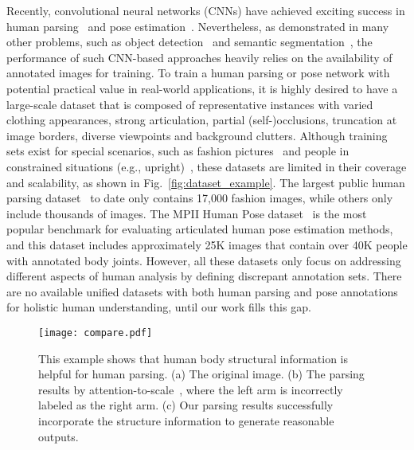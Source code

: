 \documentclass[10pt,journal,compsoc]{IEEEtran}
\begin{document}
Recently, convolutional neural networks (CNNs) have achieved exciting success in human parsing~\cite{ATR,Co-CNN,liang2015semantic} and pose estimation~\cite{newell2016stacked,Wei_2016_CVPR}. Nevertheless, as demonstrated in many other problems, such as object detection~\cite{liang2015towards} and semantic segmentation~\cite{crfasrnn}, the performance of such CNN-based approaches heavily relies on the availability of annotated images for training. To train a human parsing or pose network with potential practical value in real-world applications, it is highly desired to have a large-scale dataset that is composed of representative instances with varied clothing appearances, strong articulation, partial (self-)occlusions, truncation at image borders, diverse viewpoints and background clutters. Although training sets exist for special scenarios, such as fashion pictures~\cite{Yamaguchiparsing13,Dongparsing13,ATR,Co-CNN} and people in constrained situations (e.g., upright)~\cite{chen2014detect}, these datasets are limited in their coverage and scalability, as shown in Fig.~\ref{fig:dataset_example}. The largest public human parsing dataset~\cite{Co-CNN} to date only contains 17,000 fashion images, while others only include thousands of images. The MPII Human Pose dataset~\cite{andriluka14cvpr} is the most popular benchmark for evaluating articulated human pose estimation methods, and this dataset includes approximately 25K images that contain over 40K people with annotated body joints. However, all these datasets only focus on addressing different aspects of human analysis by defining discrepant annotation sets. There are no available unified datasets with both human parsing and pose annotations for holistic human understanding, until our work fills this gap.


\begin{figure}[t]
\centering
   \texttt{[image: compare.pdf]}
\vspace{-8mm}
\caption{This example shows that human body structural information is helpful for human parsing. (a) The original image. (b) The parsing results by attention-to-scale~\cite{chen2015attention}, where the left arm is incorrectly labeled as the right arm. (c) Our parsing results successfully incorporate the structure information to generate reasonable outputs.}
\vspace{-6mm}
\label{fig: example_compare}
\end{figure}
\end{document}
